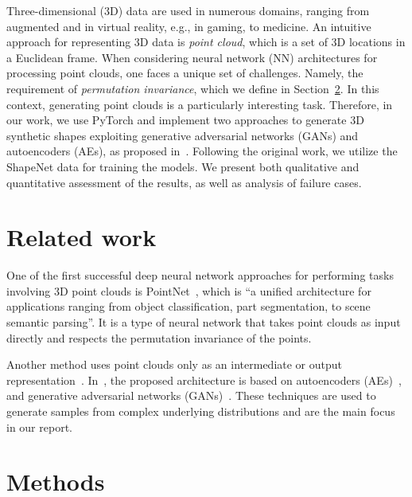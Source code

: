 \documentclass[12pt]{article}
\newcommand{\contentdescription}[1]{}
\begin{document}
    Three-dimensional (3D) data are used in numerous domains, ranging from augmented and in virtual reality, e.g., in gaming, to medicine.
    An intuitive approach for representing 3D data is \emph{point cloud}, which is a set of 3D locations in a Euclidean frame.
    When considering neural network (NN) architectures for processing point clouds, one faces a unique set of challenges. Namely, the requirement of \textit{permutation invariance}, which we define in Section~\ref{methods}.
    In this context, generating point clouds is a particularly interesting task.
    Therefore, in our work, we use PyTorch and implement two approaches to generate 3D synthetic shapes exploiting generative adversarial networks (GANs) and autoencoders (AEs), as proposed in~\cite{pmlr-v80-achlioptas18a}. Following the original work, we utilize the ShapeNet data for training the models. We present both qualitative and quantitative assessment of the results, as well as analysis of failure cases.


    \section{Related work}
    \contentdescription{
        Related Work (5-15\%):
        Discuss the published work related to your project paper, the types of experiments you do and the additional method that you have added to this work or you have compared this paper with (if any).
    }

    One of the first successful deep neural network approaches for performing tasks involving 3D point clouds is PointNet~\cite{arxiv:1612.00593},
    which is ``a unified architecture for applications ranging from object classification, part segmentation, to scene semantic parsing''.
    It is a type of neural network that takes point clouds as input directly and respects the permutation invariance of the points.

    Another method uses point clouds only as an intermediate or output representation~\cite{arxiv:1612.02808, arxiv:1612.00603}.
    In~\cite{pmlr-v80-achlioptas18a}, the proposed architecture is based on autoencoders (AEs)~\cite{doi:10.5555/65669.104451, arxiv:1312.6114},
    and generative adversarial networks (GANs)~\cite{NIPS2014_5ca3e9b1, arxiv:1511.06434, arxiv:1612.02136}.
    These techniques are used to generate samples from complex underlying distributions and are the main focus in our report.


    \section{Methods}
    \label{methods}
    \contentdescription{
        Methods (15-25\%):
        Describe the original paper's method to the extent that you would need to make your report and findings understandable.
        Otherwise, here you can describe other methods that you compare with or other methods that you apply on top of what you reimplemented.
        Here, you also try to justify any methodical modification or incremental changes that you have added to the original paper.
        It may be helpful to include figures, diagrams, or tables to describe your method or compare it with other methods.
    }
\end{document}
